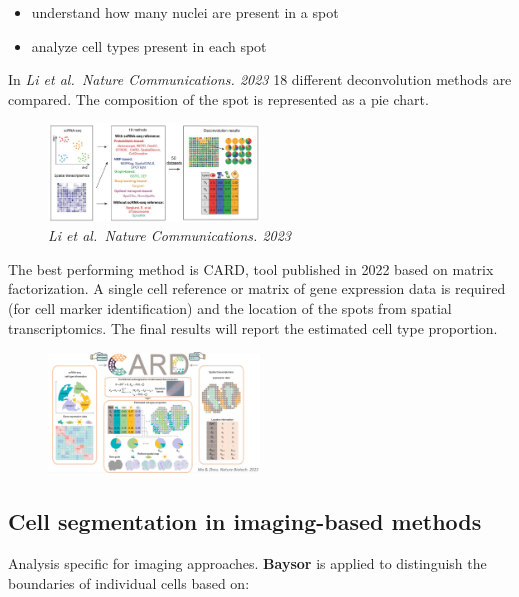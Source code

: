 \begin{itemize}
\tightlist
\item
  understand how many nuclei are present in a spot
\item
  analyze cell types present in each spot
\end{itemize}

In \emph{Li et al.~Nature Communications. 2023} 18 different
deconvolution methods are compared. The composition of the spot is
represented as a pie chart.

\begin{figure}
\centering
\includegraphics[width=0.5\textwidth]{images/Screenshot_8.png}
\caption{\emph{Li et al.~Nature Communications. 2023}}
\end{figure}


The best performing method is CARD, tool published in 2022 based on
matrix factorization. A single cell reference or matrix of gene
expression data is required (for cell marker identification) and the
location of the spots from spatial transcriptomics. The final results
will report the estimated cell type proportion.

\begin{figure}
\centering
\includegraphics[width=0.5\textwidth]{images/Screenshot_9.png}
\caption{}
\end{figure}

\hypertarget{cell-segmentation-in-imaging-based-methods}{%
\subsection{Cell segmentation in imaging-based
methods}\label{cell-segmentation-in-imaging-based-methods}}

Analysis specific for imaging approaches. \textbf{Baysor} is applied to
distinguish the boundaries of individual cells based on:

